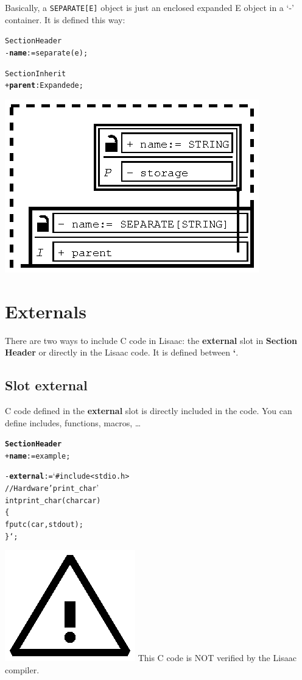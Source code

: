 \documentclass[11pt]{mybook}
\newcommand{\warning}{\includegraphics[scale=0.3]{figures/warning}}
\begin{document}
Basically, a \verb!SEPARATE[E]! object is just an enclosed expanded E
object in a `-' container. It is defined this way: 

\begin{alltt}
Section Header
  - {\bf{}name} := {\sc{}separate(e)};

Section Inherit
  + {\bf{}parent}:{\tt{}Expanded} {\sc{}e};
\end{alltt}

\begin{center}
  \includegraphics{figures/cop-separate.ps}
\end{center}

\section{Externals}
\label{language_reference:externals}
%
There are two ways to include C code in Lisaac: the {\bf{}external} slot in {\bf{}Section Header} or directly in the Lisaac code. It is defined between {\bf{}`}.
\subsection{Slot external}
\label{language_reference:externals:slot_external}
%
C code defined in the {\bf{}external} slot is directly included in the code. You can define includes, functions, macros, \ldots
\begin{alltt}
{\bf{}Section Header}
  + {\bf{}name} := {\sc{}example};

  - {\bf{}external} := `#include <stdio.h>
                      // Hardware 'print_char'
                      int print_char(char car)
                      \{
                         fputc(car,stdout);
                      \}`;
\end{alltt}
\warning{} This C code is NOT verified by the Lisaac compiler.
\end{document}
